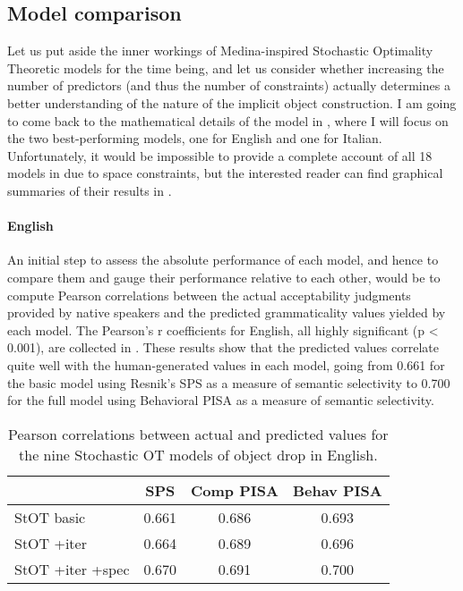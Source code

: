 

\subsection{Model comparison} 

Let us put aside the inner workings of Medina-inspired Stochastic Optimality Theoretic models for the time being, and let us consider whether increasing the number of predictors (and thus the number of constraints) actually determines a better understanding of the nature of the implicit object construction. I am going to come back to the mathematical details of the model in , where I will focus on the two best-performing models, one for English and one for Italian. Unfortunately, it would be impossible to provide a complete account of all 18 models in  due to space constraints, but the interested reader can find graphical summaries of their results in .

\paragraph{English} An initial step to assess the absolute performance of each model, and hence to compare them and gauge their performance relative to each other, would be to compute Pearson correlations between the actual acceptability judgments provided by native speakers and the predicted grammaticality values yielded by each model. The Pearson's r coefficients for English, all highly significant (p < 0.001), are collected in . These results show that the predicted values correlate quite well with the human-generated values in each model, going from 0.661 for the basic model using Resnik's SPS as a measure of semantic selectivity to 0.700 for the full model using Behavioral PISA as a measure of semantic selectivity.

\begin{table}[htb] %
\caption{Pearson correlations between actual and predicted values for the nine Stochastic OT models of object drop in English.}
\begin{tabular}{l|ccc}
& SPS & Comp PISA & Behav PISA \\
\hline
StOT basic           & 0.661        & 0.686     & 0.693      \\
StOT +iter           & 0.664        & 0.689     & 0.696      \\
StOT +iter +spec     & 0.670        & 0.691     & 0.700     
\end{tabular}
\end{table}

